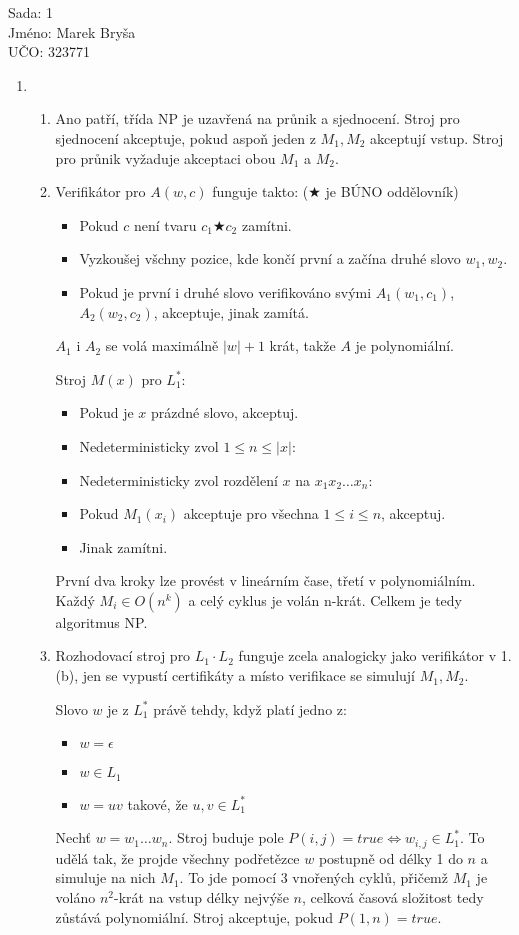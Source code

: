 \documentclass[a4paper,10pt]{extarticle}
\begin{document}
\begin{flushleft}
Sada: 1 \\ 
Jméno: Marek Bryša \\
UČO: 323771\\
\end{flushleft}
\begin{enumerate}
  \item
	\begin{enumerate}
		\item
			Ano patří, třída NP je uzavřená na průnik a sjednocení. Stroj pro sjednocení akceptuje, pokud aspoň jeden z $M_1,M_2$ akceptují vstup. Stroj pro průnik vyžaduje akceptaci obou $M_1$ a $M_2$.
		\item
			Verifikátor pro $A(w,c)$ funguje takto: ($\bigstar$ je BÚNO oddělovník)
			\begin{itemize}
				\item Pokud $c$ není tvaru $c_1\bigstar c_2$ zamítni.			
				\item Vyzkoušej všchny pozice, kde končí první a začína druhé slovo $w_1, w_2$.
				\item Pokud je první i druhé slovo verifikováno svými $A_1(w_1,c_1)$, $A_2(w_2,c_2)$, akceptuje, jinak zamítá.
			\end{itemize}
			$A_1$ i $A_2$ se volá maximálně $|w|+1$ krát, takže $A$ je polynomiální.
			
			Stroj $M(x)$ pro $L_1^*$:
			\begin{itemize}
				\item	Pokud je $x$ prázdné slovo, akceptuj.
				\item Nedeterministicky zvol $1\leq n \leq |x|$:
				\item Nedeterministicky zvol rozdělení $x$ na $x_1x_2\dots x_n$:
				\item Pokud $M_1(x_i)$ akceptuje pro všechna $1\leq i \leq n$, akceptuj.
				\item Jinak zamítni.
			\end{itemize}
			První dva kroky lze provést v lineárním čase, třetí v polynomiálním. Každý $M_i\in O(n^k)$ a celý cyklus je volán n-krát. Celkem je tedy algoritmus NP.
		\item
			Rozhodovací stroj pro $L_1\cdot L_2$ funguje zcela analogicky jako verifikátor v 1.(b), jen se vypustí certifikáty a místo verifikace se simulují $M_1, M_2$.
			
			Slovo $w$ je z $L_1^*$ právě tehdy, když platí jedno z:
			\begin{itemize}
				\item $w=\epsilon$
				\item $w\in L_1$
				\item $w=uv$ takové, že $u,v \in L_1^*$
			\end{itemize}
			Nechť $w=w_1\dots w_n$. Stroj buduje pole $P(i,j)=true \iff w_{i,j}\in L_1^*$. To udělá tak, že projde všechny podřetězce $w$ postupně od délky 1 do $n$ a simuluje na nich $M_1$. To jde pomocí 3 vnořených cyklů, přičemž $M_1$ je voláno $n^2$-krát na vstup délky nejvýše $n$, celková časová složitost tedy zůstává polynomiální. Stroj akceptuje, pokud $P(1,n)=true$.
	\end{enumerate}
\end{enumerate}
\end{document}
